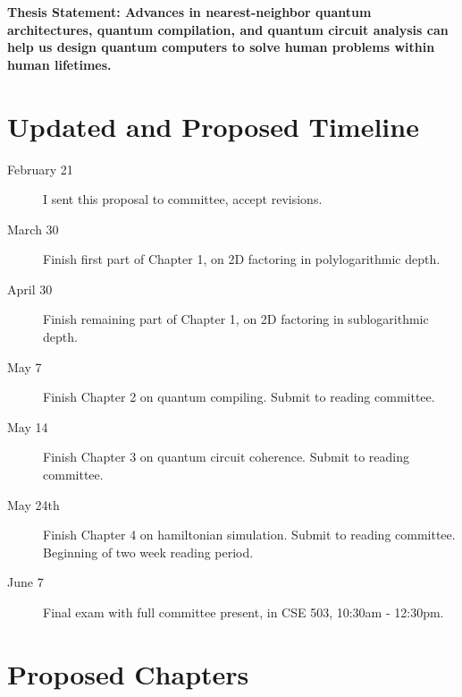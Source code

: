 \documentclass[]{article}
\theoremstyle{plain} \newtheorem{lemma}{Lemma}
\begin{document}
\textbf{Thesis Statement: Advances in nearest-neighbor quantum architectures,
quantum compilation, and quantum circuit analysis can help us design
quantum computers to solve human problems within human lifetimes.}

\pagebreak
\section{Updated and Proposed Timeline}

\begin{description}
\item[February 21]
I sent this proposal to committee, accept revisions.

\item[March 30]
Finish first part of Chapter 1, on 2D factoring in polylogarithmic
depth.

\item[April 30]
Finish remaining part of Chapter 1, on 2D factoring in sublogarithmic
depth.

\item[May 7]
Finish Chapter 2 on quantum compiling. Submit to reading committee.

\item[May 14]
Finish Chapter 3 on quantum circuit coherence.
Submit to reading committee.

\item[May  24th]
Finish Chapter 4 on hamiltonian simulation.
Submit to reading committee.
Beginning of two week reading period.

\item[June 7]
Final exam with full committee present, in CSE 503, 10:30am - 12:30pm.

\end{description}

\section{Proposed Chapters}
\end{document}

